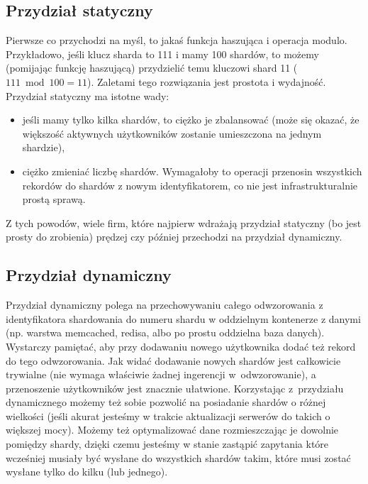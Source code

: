 \documentclass[a4paper,12pt]{article}
\begin{document}
\subsection{Przydział statyczny}

Pierwsze co przychodzi na myśl, to jakaś funkcja haszująca i operacja modulo. Przykładowo, jeśli klucz sharda to 111 i mamy 100 shardów, to możemy (pomijając funkcję haszującą) przydzielić temu kluczowi shard 11 ($111 \bmod 100 = 11$). Zaletami tego rozwiązania jest prostota i wydajność. Przydział statyczny ma istotne wady:

\begin{itemize}
 \setlength{\itemsep}{0.06cm}
 \setlength{\parskip}{0.06cm}
 \item jeśli mamy tylko kilka shardów, to ciężko je zbalansować (może się okazać, że większość aktywnych użytkowników zostanie umieszczona na jednym shardzie),
 \item ciężko zmieniać liczbę shardów. Wymagałoby to operacji przenosin wszystkich rekordów do shardów z nowym identyfikatorem, co nie jest infrastrukturalnie prostą sprawą.
\end{itemize}

Z tych powodów, wiele firm, które najpierw wdrażają przydział statyczny (bo jest prosty do zrobienia) prędzej czy później przechodzi na przydział dynamiczny.

\subsection{Przydział dynamiczny}

Przydział dynamiczny polega na przechowywaniu całego odwzorowania z identyfikatora shardowania do numeru shardu w oddzielnym kontenerze z danymi (np. warstwa memcached, redisa, albo po prostu oddzielna baza danych). Wystarczy pamiętać, aby przy dodawaniu nowego użytkownika dodać też rekord do tego odwzorowania. Jak widać dodawanie nowych shardów jest całkowicie trywialne (nie wymaga właściwie żadnej ingerencji w~odwzorowanie), a przenoszenie użytkowników jest znacznie ułatwione. Korzystając z~przydziału dynamicznego możemy też sobie pozwolić na posiadanie shardów o różnej wielkości (jeśli akurat jesteśmy w trakcie aktualizacji serwerów do takich o większej mocy). Możemy też optymalizować dane rozmieszczając je dowolnie pomiędzy shardy, dzięki czemu jesteśmy w stanie zastąpić zapytania które wcześniej musiały być wysłane do wszystkich shardów takim, które musi zostać wysłane tylko do kilku (lub jednego).
\end{document}
